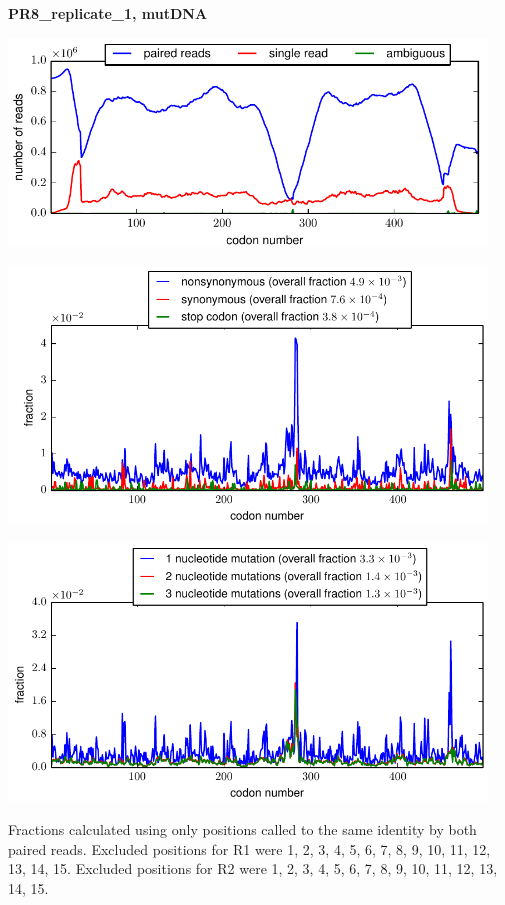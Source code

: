 \documentclass[10pt,letterpaper]{article}
\begin{document}
\centerline{\Large \bf PR8\_replicate\_1, mutDNA}
\vspace{0.1in}

\centerline{\includegraphics[width=5in]{PR8_replicate_1_mutDNA_codondepth.pdf}}
\vspace{0.1in}

\centerline{\includegraphics[width=5in]{PR8_replicate_1_mutDNA_syn-ns-dist.pdf}}
\vspace{0.1in}

\centerline{\includegraphics[width=5in]{PR8_replicate_1_mutDNA_nmutspercodon-dist.pdf}}
\vspace{0.1in}

Fractions calculated using only positions called to the same identity by both paired reads.  Excluded positions for R1 were 1, 2, 3, 4, 5, 6, 7, 8, 9, 10, 11, 12, 13, 14, 15. 
 Excluded positions for R2 were 1, 2, 3, 4, 5, 6, 7, 8, 9, 10, 11, 12, 13, 14, 15. 
\end{document}
